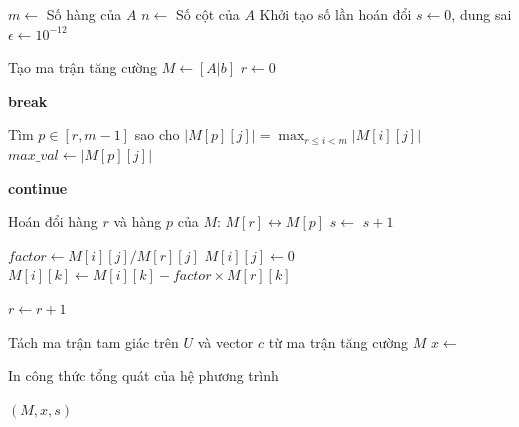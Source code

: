 \begin{algorithm}[H]
\caption{Khử Gauss với Partial Pivoting (Chọn phần tử chốt một phần)}
\label{alg:gaussian_elimination}
\begin{algorithmic}[1]
    \State $m \gets$ Số hàng của $A$
    \State $n \gets$ Số cột của $A$
    \State Khởi tạo số lần hoán đổi $s \gets 0$, dung sai $\epsilon \gets 10^{-12}$
    
    \State Tạo ma trận tăng cường $M \gets [A | b]$ 
    \State $r \gets 0$ 
    
     
            \State \textbf{break} 
        \EndIf
        
        \State Tìm $p \in [r, m-1]$ sao cho $|M[p][j]| = \max_{r \leq i < m} |M[i][j]|$
        \State $max\_val \gets |M[p][j]|$
        
            \State \textbf{continue} 
        \EndIf
        
            \State Hoán đổi hàng $r$ và hàng $p$ của $M$: $M[r] \leftrightarrow M[p]$
            \State $s \gets $ $s + 1$
        \EndIf
        
         
            \State $factor \gets M[i][j] / M[r][j]$
            \State $M[i][j] \gets 0$ 
             
                \State $M[i][k] \gets M[i][k] - factor \times M[r][k]$
            \EndFor
        \EndFor
        
        \State $r \gets r + 1$ 
    \EndFor
    
    \State Tách ma trận tam giác trên $U$ và vector $c$ từ ma trận tăng cường $M$
    \State $x \gets$  
    
        \State In công thức tổng quát của hệ phương trình
    \EndIf
    
    \State \Return $(M, x, s)$
\EndProcedure
\end{algorithmic}
\end{algorithm}

